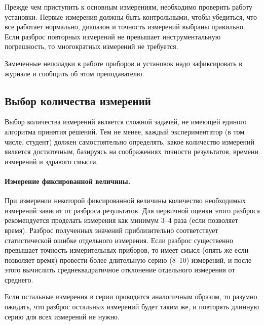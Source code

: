Прежде чем приступить к основным измерениям, необходимо проверить
работу установки. Первые измерения должны быть контрольными, чтобы
убедиться, что все работает нормально, диапазон и точность измерений
выбраны правильно. Если разброс повторных измерений не превышает
инструментальную погрешность, то многократных измерений не требуется.

Замеченные неполадки в работе приборов и установок надо зафиксировать в журнале
и сообщить об этом преподавателю.

\subsection{Выбор количества измерений}

Выбор количества измерений является сложной задачей, не имеющей
единого алгоритма принятия решений. Тем не менее, каждый экспериментатор
(в том числе, студент) должен самостоятельно определять, какое количество
измерений является достаточным, базируясь на соображениях точности результатов,
времени измерений и здравого смысла.


\paragraph{Измерение фиксированной величины.}
При измерении некоторой фиксированной величины количество необходимых измерений
зависит от разброса результатов. Для первичной оценки этого разброса
рекомендуется проделать измерения как минимум 3--4 раза (если позволяет время).
Разброс полученных значений приблизительно соответствует
статистической ошибке отдельного измерения. Если разброс существенно превышает
точность измерительных приборов, то имеет смысл (опять же если позволяет время)
провести более длительную серию (8--10) измерений, и после этого вычислить
среднеквадратичное отклонение отдельного измерения от среднего.

Если остальные измерения в серии проводятся аналогичным образом,
то разумно ожидать, что разброс остальных измерений будет таким же,
и повторять длинную серию  для всех измерений не нужно.

